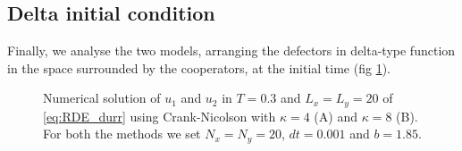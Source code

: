 \subsection{Delta initial condition}

Finally, we analyse the two models, arranging the defectors in delta-type
function in the space surrounded by the cooperators, at the initial
time (fig \ref{fig:delta-2}). 

\begin{figure}

\caption{\label{fig:delta-2}Numerical solution of $u_{1}$ and $u_{2}$ in
$T=0.3$ and $L_{x}=L_{y}=20$ of \ref{eq:RDE_durr} using Crank-Nicolson
with $\kappa=4$ (A) and $\kappa=8$ (B). For both the methods we
set $N_{x}=N_{y}=20$, $dt=0.001$ and $b=1.85$.}
\end{figure}


